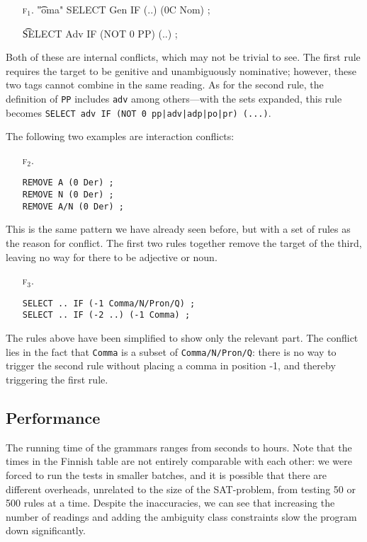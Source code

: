 {{\begin{itemize}
\item[\textsc{f$_1$}.]\t{"oma" SELECT Gen IF (..) (0C Nom) ;}

\item[] \t{SELECT Adv IF (NOT 0 PP) (..) ;}
\end{itemize}

Both of these are internal conflicts, which may not be trivial to see.
The first rule requires the target to be genitive and unambiguously nominative; however, these two tags cannot combine in the same reading.
As for the second rule, the definition of \texttt{PP} includes \texttt{adv} among others---with the sets expanded, this rule becomes \texttt{SELECT adv IF (NOT 0 pp|adv|adp|po|pr) (...)}.

The following two examples are interaction conflicts:

\begin{itemize}
\item[\textsc{f$_2$}.]\begin{verbatim}
REMOVE A (0 Der) ; 
REMOVE N (0 Der) ; 
REMOVE A/N (0 Der) ; 
\end{verbatim}
\end{itemize}

This is the same pattern we have already seen before, but with a set of rules as the reason for conflict.
The first two rules together remove the target of the third, leaving no way for there to be adjective or noun.

\begin{itemize}
\item[\textsc{f$_3$.}]\begin{verbatim}
SELECT .. IF (-1 Comma/N/Pron/Q) ;
SELECT .. IF (-2 ..) (-1 Comma) ;
\end{verbatim}
\end{itemize}

The rules above have been simplified to show only the relevant part.
The conflict lies in the fact that \texttt{Comma} is a subset of \texttt{Comma/N/Pron/Q}:
there is no way to trigger the second rule without placing a comma in position -1, and thereby triggering the first rule.




\subsection{Performance} 
The running time of the grammars ranges from seconds to hours. 
Note that the times in the Finnish table are not entirely comparable with each other: we were forced to run the tests in smaller batches, and it is possible that there are different overheads, unrelated to the size of the SAT-problem, from testing 50 or 500 rules at a time. 
Despite the inaccuracies, we can see that increasing the number of readings 
and adding the ambiguity class constraints
slow the program down significantly.

}}
